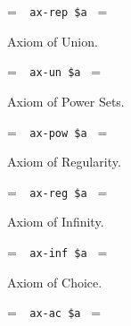 \setbox\startprefix=\hbox{\tt \ \ ax-rep\ \$a\ }
\setbox\contprefix=\hbox{\tt \ \ \ \ \ \ \ \ \ \ \ \ }
\startm
\m{\vdash}\m{(}\m{\forall}\m{\exists}\m{\forall}\m{(}\m{%
\forall}\m{\varphi}\m{\rightarrow}\m{=}\m{)}\m{\rightarrow}\m{%
\exists}\m{\forall}\m{(}\m{\in}\m{\leftrightarrow}\m{%
\exists}\m{(}\m{\in}\m{\wedge}\m{\forall}\m{\varphi}\m{)}%
\m{)}\m{)}
\endm

\noindent Axiom of Union.

\setbox\startprefix=\hbox{\tt \ \ ax-un\ \$a\ }
\setbox\contprefix=\hbox{\tt \ \ \ \ \ \ \ \ \ \ \ }
\startm
\m{\vdash}\m{\exists}\m{\forall}\m{(}\m{\exists}\m{(}\m{
\in}\m{\wedge}\m{\in}\m{)}\m{\rightarrow}\m{\in}\m{)}
\endm

\noindent Axiom of Power Sets.

\setbox\startprefix=\hbox{\tt \ \ ax-pow\ \$a\ }
\setbox\contprefix=\hbox{\tt \ \ \ \ \ \ \ \ \ \ \ \ }
\startm
\m{\vdash}\m{\exists}\m{\forall}\m{(}\m{\forall}\m{(}\m{
\in}\m{\rightarrow}\m{\in}\m{)}\m{\rightarrow}\m{\in}
\m{)}
\endm

\noindent Axiom of Regularity.

\setbox\startprefix=\hbox{\tt \ \ ax-reg\ \$a\ }
\setbox\contprefix=\hbox{\tt \ \ \ \ \ \ \ \ \ \ \ \ }
\startm
\m{\vdash}\m{(}\m{\exists}\m{\in}\m{\rightarrow}\m{\exists}
\m{(}\m{\in}\m{\wedge}\m{\forall}\m{(}\m{\in}\m{
\rightarrow}\m{\lnot}\m{\in}\m{)}\m{)}\m{)}
\endm

\noindent Axiom of Infinity.

\setbox\startprefix=\hbox{\tt \ \ ax-inf\ \$a\ }
\setbox\contprefix=\hbox{\tt \ \ \ \ \ \ \ \ \ \ \ \ \ \ \ }
\startm
\m{\vdash}\m{\exists}\m{(}\m{\in}\m{\wedge}\m{\forall}%
\m{(}\m{\in}\m{\rightarrow}\m{\exists}\m{(}\m{\in}\m{%
\wedge}\m{\in}\m{)}\m{)}\m{)}
\endm

\noindent Axiom of Choice.

\setbox\startprefix=\hbox{\tt \ \ ax-ac\ \$a\ }
\setbox\contprefix=\hbox{\tt \ \ \ \ \ \ \ \ \ \ \ \ \ \ }
\startm
\m{\vdash}\m{\exists}\m{\forall}\m{\forall}\m{(}\m{(}\m{%
\in}\m{\wedge}\m{\in}\m{)}\m{\rightarrow}\m{\exists}\m{%
\forall}\m{(}\m{\exists}\m{(}\m{(}\m{\in}\m{\wedge}%
\m{\in}\m{)}\m{\wedge}\m{(}\m{\in}\m{\wedge}\m{\in}%
\m{)}\m{)}\m{\leftrightarrow}\m{=}\m{)}\m{)}
\endm

